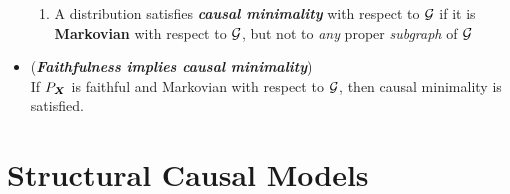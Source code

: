 \documentclass[11pt]{article}
\begin{document}
\begin{itemize}
\begin{definition}
\begin{enumerate}
\item A distribution satisfies \textbf{\emph{causal minimality}} with respect to ${\mathcal G}$ if it is \textbf{Markovian} with respect to ${\mathcal G}$, but not to \emph{any} proper \emph{subgraph} of ${\mathcal G}$
\end{enumerate}
\end{definition}

\item \begin{proposition} (\emph{\textbf{Faithfulness implies causal minimality}}) \citep{peters2017elements}\\
 If $P_{\boldsymbol{X}}$ is faithful and Markovian with respect to ${\mathcal G}$, then causal minimality is satisfied.
\end{proposition}
\end{itemize}

\newpage
\section{Structural Causal Models}
\end{document}
